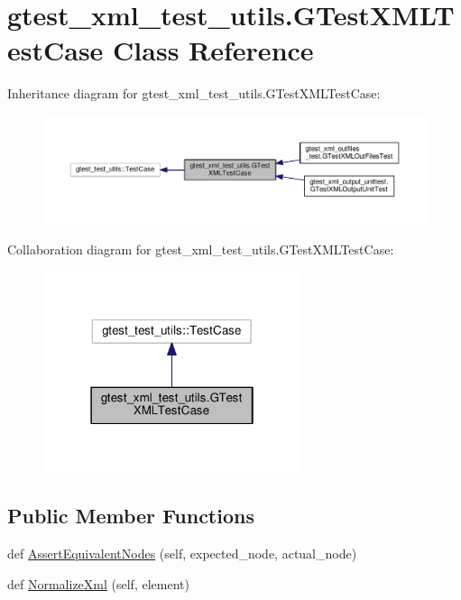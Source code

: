\hypertarget{classgtest__xml__test__utils_1_1GTestXMLTestCase}{}\section{gtest\+\_\+xml\+\_\+test\+\_\+utils.\+G\+Test\+X\+M\+L\+Test\+Case Class Reference}
\label{classgtest__xml__test__utils_1_1GTestXMLTestCase}


Inheritance diagram for gtest\+\_\+xml\+\_\+test\+\_\+utils.\+G\+Test\+X\+M\+L\+Test\+Case\+:
\nopagebreak
\begin{figure}[H]
\begin{center}
\leavevmode
\includegraphics[width=350pt]{classgtest__xml__test__utils_1_1GTestXMLTestCase__inherit__graph}
\end{center}
\end{figure}


Collaboration diagram for gtest\+\_\+xml\+\_\+test\+\_\+utils.\+G\+Test\+X\+M\+L\+Test\+Case\+:
\nopagebreak
\begin{figure}[H]
\begin{center}
\leavevmode
\includegraphics[width=214pt]{classgtest__xml__test__utils_1_1GTestXMLTestCase__coll__graph}
\end{center}
\end{figure}
\subsection*{Public Member Functions}
\begin{DoxyCompactItemize}
\item 
def \hyperlink{classgtest__xml__test__utils_1_1GTestXMLTestCase_a977273e8863f4f41d121bb5a64b08d32}{Assert\+Equivalent\+Nodes} (self, expected\+\_\+node, actual\+\_\+node)
\item 
def \hyperlink{classgtest__xml__test__utils_1_1GTestXMLTestCase_ac4823e96c3b5327b25a340a3605447d9}{Normalize\+Xml} (self, element)
\end{DoxyCompactItemize}
